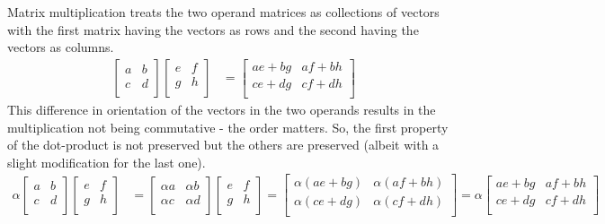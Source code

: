 \documentclass[MathsNotesBase.tex]{subfiles}
\begin{document}
{		Matrix multiplication treats the two operand matrices as collections of vectors with the first matrix having the vectors as rows and the second having the vectors as columns.
		\begin{align*}
			\begin{bmatrix}
			a & b \\
			c & d \\
			\end{bmatrix}
			\begin{bmatrix}
			e & f \\
			g & h \\
			\end{bmatrix}
			&=
			\begin{bmatrix}
			ae + bg & af + bh \\
			ce + dg & cf + dh \\
			\end{bmatrix}
		\end{align*}
		This difference in orientation of the vectors in the two operands results in the multiplication not being commutative - the order matters. So, the first property of the dot-product is not preserved but the others are preserved (albeit with a slight modification for the last one).
		\begin{align*}						
			\alpha
			\begin{bmatrix}
			a & b \\
			c & d \\
			\end{bmatrix}
			\begin{bmatrix}
			e & f \\
			g & h \\
			\end{bmatrix}
			&=
			\begin{bmatrix}
			\alpha a & \alpha b \\
			\alpha c & \alpha d \\
			\end{bmatrix}
			\begin{bmatrix}
			e & f \\
			g & h \\
			\end{bmatrix}
			=
			\begin{bmatrix}
			\alpha(ae + bg) & \alpha(af + bh) \\
			\alpha(ce + dg) & \alpha(cf + dh) \\
			\end{bmatrix}
			=
			\alpha
			\begin{bmatrix}
			ae + bg & af + bh \\
			ce + dg & cf + dh \\
			\end{bmatrix}		
		\end{align*}
		
}
\end{document}
